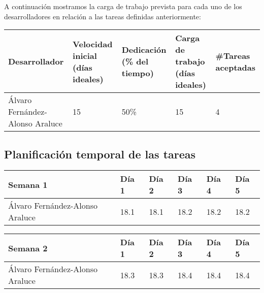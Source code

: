 A continuación mostramos la carga de trabajo prevista para cada uno de los desarrolladores en relación a las tareas definidas anteriormente:

\begin{table}[h]
	\centering
	\begin{tabular}{| p{3cm} | p{2cm} | p{2cm} | p{2cm} | p{2cm} |}
		\rowcolor[HTML]{329A9D} 
		{\color[HTML]{FFFFFF} \textbf{Desarrollador}} & {\color[HTML]{FFFFFF} \textbf{Velocidad inicial (días ideales)}} & {\color[HTML]{FFFFFF} \textbf{Dedicación (\% del tiempo)}} & {\color[HTML]{FFFFFF} \textbf{Carga de trabajo (días ideales)}} & {\color[HTML]{FFFFFF} \textbf{\#Tareas aceptadas}}  \\ \hline
		Álvaro Fernández-Alonso Araluce & 15 & 50\% & 15 & 4 \\ \hline
	\end{tabular}
\end{table}

\subsection{Planificación temporal de las tareas}

\begin{table}[h]
	\centering
	\begin{tabular}{| p{2cm} | p{2cm} | p{2cm} | p{2cm} | p{2cm} | p{2cm} |}
		\rowcolor[HTML]{329A9D} 
		 {\color[HTML]{FFFFFF} \textbf{Semana 1}} & {\color[HTML]{FFFFFF} \textbf{Día 1}} & {\color[HTML]{FFFFFF} \textbf{Día 2}} & {\color[HTML]{FFFFFF} \textbf{Día 3}} & {\color[HTML]{FFFFFF} \textbf{Día 4}}  & {\color[HTML]{FFFFFF} \textbf{Día 5}} \\ \hline
		Álvaro Fernández-Alonso Araluce & 18.1 & 18.1 & 18.2 & 18.2 & 18.2 \\ \hline
	\end{tabular}
\end{table}

\begin{table}[h]
	\centering
	\begin{tabular}{| p{2cm} | p{2cm} | p{2cm} | p{2cm} | p{2cm} | p{2cm} |}
		\rowcolor[HTML]{329A9D} 
		{\color[HTML]{FFFFFF} \textbf{Semana 2}} & {\color[HTML]{FFFFFF} \textbf{Día 1}} & {\color[HTML]{FFFFFF} \textbf{Día 2}} & {\color[HTML]{FFFFFF} \textbf{Día 3}} & {\color[HTML]{FFFFFF} \textbf{Día 4}}  & {\color[HTML]{FFFFFF} \textbf{Día 5}} \\ \hline
		Álvaro Fernández-Alonso Araluce & 18.3 & 18.3 & 18.4 & 18.4 & 18.4 \\ \hline
	\end{tabular}
\end{table}

